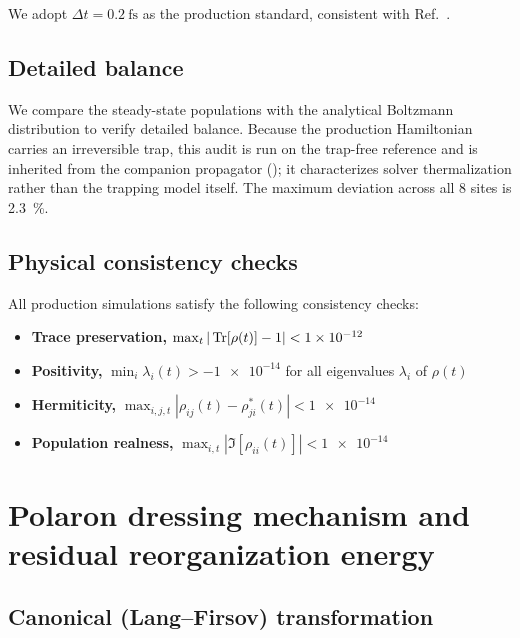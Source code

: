 \documentclass[11pt,a4paper]{article}
\begin{document}
We adopt $\Delta t = \qty{0.2}{\fs}$ as the production standard, consistent with Ref.~\cite{TeguiaKouam2026}.

\subsection{Detailed balance}

We compare the steady-state populations with the analytical Boltzmann distribution to verify detailed balance. Because the production Hamiltonian carries an irreversible trap, this audit is run on the trap-free reference and is inherited from the companion propagator (); it characterizes solver thermalization rather than the trapping model itself. The maximum deviation across all 8 sites is \qty{2.3}{\percent}.

\subsection{Physical consistency checks}

All production simulations satisfy the following consistency checks:
\begin{itemize}
\item \textbf{Trace preservation,} $\max_t |\Tr[\rho(t)] - 1| < \num{1e-12}$
\item \textbf{Positivity,} $\min_i \lambda_i(t) > -\num{1e-14}$ for all eigenvalues $\lambda_i$ of $\rho(t)$
\item \textbf{Hermiticity,} $\max_{i,j,t} |\rho_{ij}(t) - \rho_{ji}^*(t)| < \num{1e-14}$
\item \textbf{Population realness,} $\max_{i,t} |\Im[\rho_{ii}(t)]| < \num{1e-14}$
\end{itemize}


\section{Polaron dressing mechanism and residual reorganization energy}
\label{SI-sec:polaron}

\subsection{Canonical (Lang--Firsov) transformation}
\end{document}
